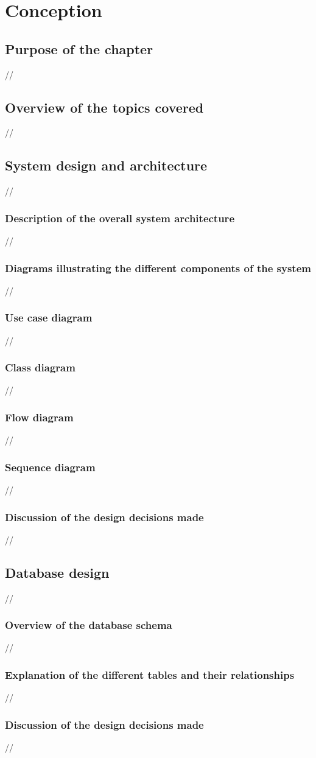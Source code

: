 \chapter{Conception}
\section {Purpose of the chapter}
//
\section {Overview of the topics covered}
//
\section {System design and architecture}
//
\subsection {Description of the overall system architecture}
//
\subsection {Diagrams illustrating the different components of the system}
//
\subsection {Use case diagram}
//
\subsection {Class diagram}
//
\subsection {Flow diagram}
//
\subsection {Sequence diagram}
//
\subsection {Discussion of the design decisions made}
//
\section {Database design}
//
\subsection {Overview of the database schema}
//
\subsection {Explanation of the different tables and their relationships}
//
\subsection {Discussion of the design decisions made}

//